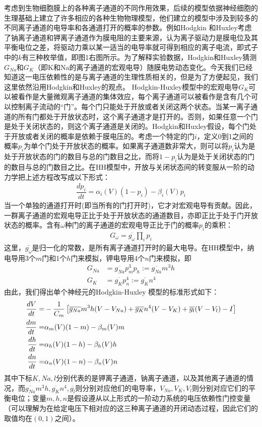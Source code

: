 \documentclass[
    bachelor,
    nofont, %
    pdflinks,
    ]{xjtuthesis}
\begin{document}
考虑到生物细胞膜上的各种离子通道的不同作用效果，后续的模型依据神经细胞的生理基础上建立了许多相应的各种生物物理模型，他们建立的模型中涉及到较多的不同离子通道的电导率和各通道打开的概率的参数。例如Hodgkin 和Huxley考虑了钠离子通道和钾离子通道作为膜电阻的主要来源，认为离子驱动力是膜电位及其平衡电位之差，将驱动力乘以某一适当的电导率就可得到相应的离子电流，即式子中的$k$有三种枚举值，即图1右图所示。为了解释实验数据，Hodgkin和Huxley猜测$G_{Na}$和$G_K$（即K和Na的离子通道的宏观电导）随膜电势动态变化。今天我们已经知道这一电压依赖性的是与离子通道的生理性质相关的，但是为了方便起见，我们这里依然沿用Hodgkin和Huxley的观点。 Hodgkin-Huxley模型中的宏观电导$G_K$可以被看作是大量微观离子通道的集体效应，每个离子通道可以被看作是含有几个可以控制离子流动的“门”。每个门只能处于开放或者关闭这两个状态。当某一离子通道的所有门都处于开放状态时，这个离子通道才是打开的。否则，如果任意一个门是处于关闭状态的，则这个离子通道是关闭的。Hodgkin和Huxley假设，每个门处于开放或者关闭的概率是依赖于膜电压的。考虑一个特定的门$i$，定义0到1之间的概率$p_i$为单个门处于开放状态的概率。如果离子通道数非常大，则可以将$p_i$认为是处于开放状态的门的数目与总的门数目之比，而将$1-p_i$认为是处于关闭状态的门的数目与总的门数目之比。在HH模型中，开放与关闭状态间的转变服从一阶的动力学把上述方程改写成以下形式：
\begin{align}
\dfrac{dp_i}{dt}= \alpha_i (V)(1-p_i)-\beta_i (V)p_i
\end{align}
当一个单独的通道打开时(即当所有的门打开时)，它才对宏观电导有贡献。因此，一群离子通道的宏观电导正比于处于开放状态的通道数目，亦即正比于处于门开放状态的概率。含有$\omega$种门的离子通道的宏观电导正比于门的概率$p_i$的乘积：
\begin{align}
G_{\omega}= \overline{g_{\omega}} \prod_i p_i
\end{align}
这里，$\bar{g_{\omega}}$是归一化的常数，是所有离子通道打开时的最大电导。在HH模型中，纳电导用3个$m$门和1个$h$门来模拟，钾电导用4个$n$门来模拟，即
\begin{align}
G_{Na}& = \overline{g_{Na}} p_m^3p_h:= \overline{g_{Na}}m^3h\\
G_{K}& = \overline{g_{K}} p_n^4:= \overline{g_{K}}n^4
\end{align}
由此，我们得出单个神经元的Hodgkin-Huxley 模型的标准形式如下：
\begin{align}
\notag \dfrac{d V}{dt} = & - \dfrac{1}{C_m} \left[ \overline{g_{Na}}m^3h(V-V_{Na})+ \overline{g_{K}}n^4(V-V_{K})+\overline{g_{l}}(V-V_{l}) - I \right] \\
\dfrac{d m}{d t} = & \alpha_m (V)(1-m)-\beta_m (V)m \\
\notag \dfrac{d h}{d t} = & \alpha_h (V)(1-h)-\beta_h (V)h \\
\notag \dfrac{d n}{d t} = & \alpha_n (V)(1-n)-\beta_n (V)n 
\end{align}
其中下标$K,Na,l$分别代表的是钾离子通道，钠离子通道，以及其他离子通道的情况，而$\overline{g_{Na}}m^3h,\overline{g_{K}}n^4,\overline{g_{l}}$则分别对应他们的电导率，$V_{Na},V_{K},V_{l}$则分别对应它们的平衡电位；变量$m,h,n$是假设遵从以上形式的一阶动力系统的电压依赖性门控变量（可以理解为在给定电压下相对应的这三种离子通道的开闭动态过程，因此它们的取值均在$(0,1)$之间）。
\end{document}
